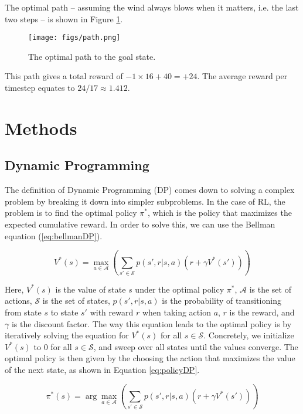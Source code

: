 \documentclass{article}
\begin{document}
The optimal path -- assuming the wind always blows when it matters, i.e. the last two steps -- is shown in Figure \ref{fig:path}.

\begin{figure}[htbp]
    \centering
    \texttt{[image: figs/path.png]}
    \caption{The optimal path to the goal state.}
    \label{fig:path}
\end{figure}

This path gives a total reward of $- 1 \times 16 + 40 = +24$.
The average reward per timestep equates to $24 / 17 \approx 1.412$.

\section{Methods}
\label{sec:methods}

\subsection{Dynamic Programming}
\label{ssec:dp}

The definition of Dynamic Programming (DP) comes down to solving a complex problem by breaking it down into simpler subproblems.
In the case of RL, the problem is to find the optimal policy $\pi^*$, which is the policy that maximizes the expected cumulative reward.
In order to solve this, we can use the Bellman equation (\ref{eq:bellmanDP}).

\begin{equation}
    V^*(s) = \max_{a \in \mathcal{A}} \left( \sum_{s' \in \mathcal{S}} p(s', r | s, a) \left( r + \gamma V^*(s') \right) \right)
    \label{eq:bellmanDP}
\end{equation}

Here, $V^*(s)$ is the value of state $s$ under the optimal policy $\pi^*$, $\mathcal{A}$ is the set of actions, $\mathcal{S}$ is the set of states, $p(s', r | s, a)$ is the probability of transitioning from state $s$ to state $s'$ with reward $r$ when taking action $a$, $r$ is the reward, and $\gamma$ is the discount factor.
The way this equation leads to the optimal policy is by iteratively solving the equation for $V^*(s)$ for all $s \in \mathcal{S}$.
Concretely, we initialize $V^*(s)$ to $0$ for all $s \in \mathcal{S}$, and sweep over all states until the values converge.
The optimal policy is then given by the choosing the action that maximizes the value of the next state, as shown in Equation \ref{eq:policyDP}.

\begin{equation}
    \pi^*(s) = \arg \max_{a \in \mathcal{A}} \left( \sum_{s' \in \mathcal{S}} p(s', r | s, a) \left( r + \gamma V^*(s') \right) \right)
    \label{eq:policyDP}
\end{equation}
\end{document}
